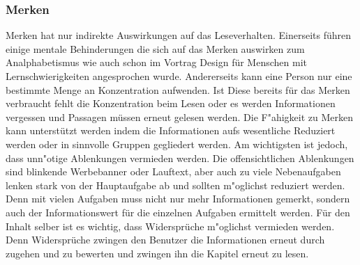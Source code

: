 \subsubsection{Merken}
Merken hat nur indirekte Auswirkungen auf das Leseverhalten. Einerseits führen einige mentale Behinderungen die sich auf das Merken auswirken zum Analphabetismus wie auch schon im Vortrag \glqq Design für Menschen mit Lernschwierigkeiten \grqq angesprochen wurde. Andererseits kann eine Person nur eine bestimmte Menge an Konzentration aufwenden. Ist Diese bereits für das Merken verbraucht fehlt die Konzentration beim Lesen oder es werden Informationen vergessen und Passagen müssen erneut gelesen werden. Die F"ahigkeit zu Merken kann unterstützt werden indem die Informationen aufs wesentliche Reduziert werden oder in sinnvolle Gruppen gegliedert werden. Am wichtigsten ist jedoch, dass unn"otige Ablenkungen vermieden werden.
Die offensichtlichen Ablenkungen sind blinkende Werbebanner oder Lauftext, aber auch zu viele Nebenaufgaben lenken stark von der Hauptaufgabe ab und sollten m"oglichst reduziert werden. Denn mit vielen Aufgaben muss nicht nur mehr Informationen gemerkt, sondern auch der Informationswert für die einzelnen Aufgaben ermittelt werden. Für den Inhalt selber ist es wichtig, dass Widersprüche m"oglichst vermieden werden. Denn Widersprüche zwingen den Benutzer die Informationen erneut durch zugehen und zu bewerten und zwingen ihn die Kapitel erneut zu lesen.

